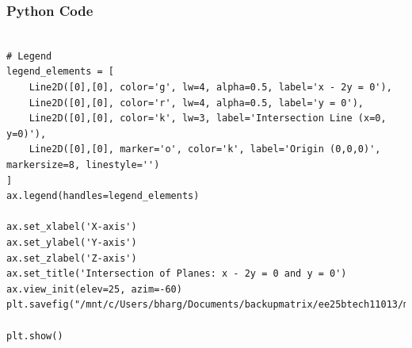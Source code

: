\documentclass{beamer}
\begin{document}
\begin{frame}[fragile]
    \frametitle{Python Code}
    \begin{lstlisting}

# Legend
legend_elements = [
    Line2D([0],[0], color='g', lw=4, alpha=0.5, label='x - 2y = 0'),
    Line2D([0],[0], color='r', lw=4, alpha=0.5, label='y = 0'),
    Line2D([0],[0], color='k', lw=3, label='Intersection Line (x=0, y=0)'),
    Line2D([0],[0], marker='o', color='k', label='Origin (0,0,0)', markersize=8, linestyle='')
]
ax.legend(handles=legend_elements)

ax.set_xlabel('X-axis')
ax.set_ylabel('Y-axis')
ax.set_zlabel('Z-axis')
ax.set_title('Intersection of Planes: x - 2y = 0 and y = 0')
ax.view_init(elev=25, azim=-60)
plt.savefig("/mnt/c/Users/bharg/Documents/backupmatrix/ee25btech11013/matgeo/12.755/figs/Figure_1.png")

plt.show()



    \end{lstlisting}
\end{frame}
\end{document}
